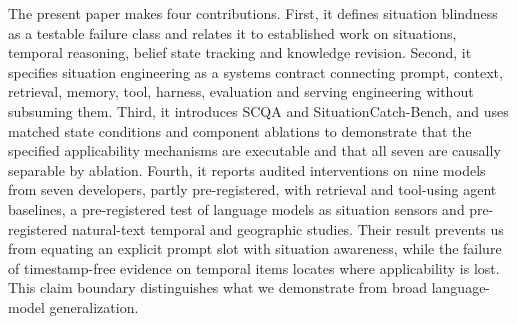 The present paper makes four contributions. First, it defines situation
blindness as a testable failure class and relates it to established work on
situations, temporal reasoning, belief state tracking and knowledge revision.
Second, it specifies situation engineering as a systems contract connecting
prompt, context, retrieval, memory, tool, harness, evaluation and serving
engineering without subsuming them. Third, it introduces SCQA and
SituationCatch-Bench, and uses matched state conditions and component ablations
to demonstrate that the specified applicability mechanisms are executable and
that all seven are causally separable by ablation. Fourth, it reports audited
interventions on nine models from seven developers, partly pre-registered, with
retrieval and tool-using agent baselines, a pre-registered test of language
models as situation sensors and pre-registered natural-text temporal and geographic studies. Their result prevents us from equating
an explicit prompt slot with situation awareness, while the failure of
timestamp-free evidence on temporal items locates where applicability is lost. This claim boundary
distinguishes what we demonstrate from broad language-model generalization.
